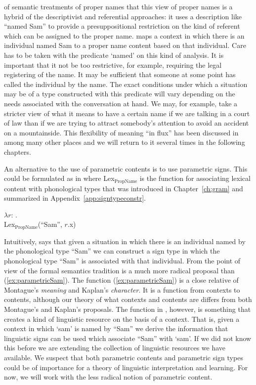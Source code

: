 of semantic treatments of proper names that this view of proper
names is a hybrid of the descriptivist and referential approaches:
it uses a description like ``named Sam'' to provide a presuppositional
restriction on the kind of referent which can be assigned to the
proper name.  \preveg{}
maps a context in which there is an individual named Sam to a proper
name content based on that individual.  Care has to be taken with the
predicate `named' on this kind of analysis.  It is important that it
not be too restrictive, for example, requiring the legal registering
of the name.  It may be sufficient that someone at some point has
called the individual by the name.  The exact conditions under which a
situation may be of a type constructed with this predicate will vary
depending on the needs associated with the conversation at hand.  We
may, for example, take a stricter view of what it means to have a
certain name if we are talking in a court of law than if we are trying
to attract somebody's attention to avoid an accident on a
mountainside.  This flexibility of meaning ``in flux'' has been
discussed in \cite{CooperKempson2008,Cooper2012,Ludlow2014,GinzburgCooper2014,KrachtKlein2014} among many other
places and we will return to it several times in the following chapters.

An alternative to the use of parametric contents is to use parametric
signs.  This could be formulated as in \nexteg{} where
Lex$_{\mathrm{PropName}}$ is the function for associating lexical
content with phonological types that was introduced in
Chapter~\ref{ch:gram} and summarized in Appendix~\ref{app:signtypeconstr}.
\begin{ex} 
$\lambda r$: . \\
\hspace*{5em}Lex$_{\mathrm{PropName}}$(``Sam'', $r$.x) 
\end{ex} 
Intuitively, \preveg{} says that given a situation in which there is
an individual named by the phonological type ``Sam'' we can construct
a sign type in which the phonological type ``Sam'' is associated with
that individual.  From the point of view of the formal semantics
tradition \preveg{} is a much more radical proposal than
(\ref{ex:parametricSam}).  The function (\ref{ex:parametricSam}) is a
close relative of Montague's \textit{meaning} and Kaplan's \textit{character}.
It is a function from contexts to contents, although our theory of
what contexts and contents are differs from both Montague's and
Kaplan's proposals.  The function in \preveg{}, however, is something
that creates a kind of linguistic resource on the basis of a context.
That is, given a context in which `sam' is named by ``Sam'' we derive
the information that linguistic signs can be used which associate
``Sam'' with `sam'.  If we did not know this before we are extending
the collection of linguistic resources we have available.  We suspect
that both parametric contents and parametric sign types could be of
importance for a theory of linguistic interpretation and learning.
For now, we will work with the less radical notion of parametric
content.  

